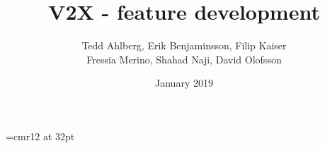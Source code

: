 \documentclass{article}
\begin{document}
\font\myfont=cmr12 at 32pt

\begin{titlepage}

\title{\vspace{7ex} { {\myfont V2X - feature development}} \vspace{50ex} }


\author{ Tedd Ahlberg, Erik Benjaminsson, Filip Kaiser \\ Fressia Merino,  Shahad Naji, David Olofsson}
\date{January 2019}
\end{titlepage}

\clearpage\maketitle
\thispagestyle{empty}

\cleardoublepage
\setcounter{page}{2}
\setlength{\parskip}{0pt plus 1pt}



\newpage

\tableofcontents


\cleardoublepage
\setcounter{page}{3}
\setlength{\parskip}{0pt plus 1pt}











\newpage


\newpage

\end{document}

